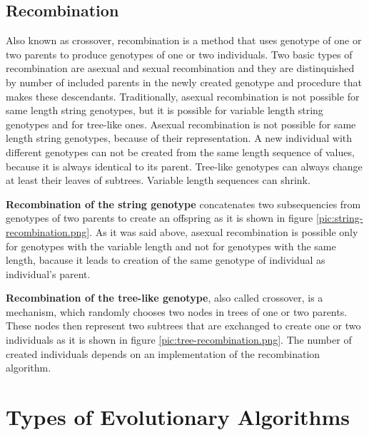 \clearpage

\subsection{Recombination}
Also known as crossover, recombination is a method that uses genotype of one or two parents to produce genotypes of one or two individuals. Two basic types of recombination are asexual and sexual recombination and they are distinquished by number of included parents in the newly created genotype and procedure that makes these descendants. Traditionally, asexual recombination is not possible for same length string genotypes, but it is possible for variable length string genotypes and for tree-like ones. Asexual recombination is not possible for same length string genotypes, because of their representation. A new individual with different genotypes can not be created from the same length sequence of values, because it is always identical to its parent. Tree-like genotypes can always change at least their leaves of subtrees. Variable length sequences can shrink.

\textbf{Recombination of the string genotype} concatenates two subsequencies from genotypes of two parents to create an offspring as it is shown in figure \ref{pic:string-recombination.png}. As it was said above, asexual recombination is possible only for genotypes with the variable length and not for genotypes with the same length, bacause it leads to creation of the same genotype of individual as individual's parent.

\textbf{Recombination of the tree-like genotype}, also called crossover, is a mechanism, which randomly chooses two nodes in trees of one or two parents. These nodes then represent two subtrees that are exchanged to create one or two individuals as it is shown in figure \ref{pic:tree-recombination.png}. The number of created individuals depends on an implementation of the recombination algorithm.

\clearpage

\section{Types of Evolutionary Algorithms}

